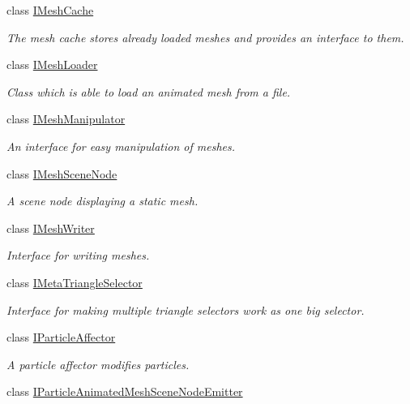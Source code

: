 \begin{DoxyCompactItemize}
class \hyperlink{classirr_1_1scene_1_1IMeshCache}{I\+Mesh\+Cache}
\begin{DoxyCompactList}\small\item\em The mesh cache stores already loaded meshes and provides an interface to them. \end{DoxyCompactList}\item 
class \hyperlink{classirr_1_1scene_1_1IMeshLoader}{I\+Mesh\+Loader}
\begin{DoxyCompactList}\small\item\em Class which is able to load an animated mesh from a file. \end{DoxyCompactList}\item 
class \hyperlink{classirr_1_1scene_1_1IMeshManipulator}{I\+Mesh\+Manipulator}
\begin{DoxyCompactList}\small\item\em An interface for easy manipulation of meshes. \end{DoxyCompactList}\item 
class \hyperlink{classirr_1_1scene_1_1IMeshSceneNode}{I\+Mesh\+Scene\+Node}
\begin{DoxyCompactList}\small\item\em A scene node displaying a static mesh. \end{DoxyCompactList}\item 
class \hyperlink{classirr_1_1scene_1_1IMeshWriter}{I\+Mesh\+Writer}
\begin{DoxyCompactList}\small\item\em Interface for writing meshes. \end{DoxyCompactList}\item 
class \hyperlink{classirr_1_1scene_1_1IMetaTriangleSelector}{I\+Meta\+Triangle\+Selector}
\begin{DoxyCompactList}\small\item\em Interface for making multiple triangle selectors work as one big selector. \end{DoxyCompactList}\item 
class \hyperlink{classirr_1_1scene_1_1IParticleAffector}{I\+Particle\+Affector}
\begin{DoxyCompactList}\small\item\em A particle affector modifies particles. \end{DoxyCompactList}\item 
class \hyperlink{classirr_1_1scene_1_1IParticleAnimatedMeshSceneNodeEmitter}{I\+Particle\+Animated\+Mesh\+Scene\+Node\+Emitter}

\end{DoxyCompactItemize}
